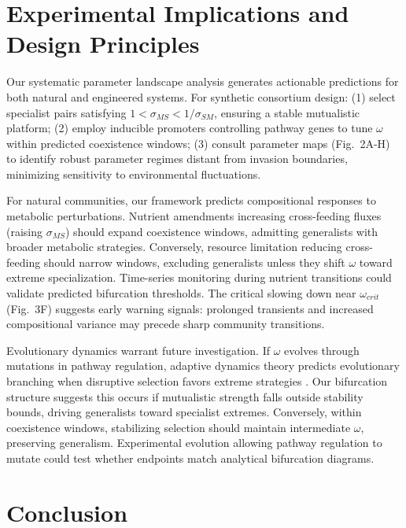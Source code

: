 \documentclass[9pt,twocolumn,twoside]{pnas-new}
\begin{document}
\section*{Experimental Implications and Design Principles}

Our systematic parameter landscape analysis generates actionable predictions for both natural and engineered systems. For synthetic consortium design: (1) select specialist pairs satisfying $1 < \sigma_{MS} < 1/\sigma_{SM}$, ensuring a stable mutualistic platform; (2) employ inducible promoters controlling pathway genes to tune $\omega$ within predicted coexistence windows; (3) consult parameter maps (Fig.~2A-H) to identify robust parameter regimes distant from invasion boundaries, minimizing sensitivity to environmental fluctuations.

For natural communities, our framework predicts compositional responses to metabolic perturbations. Nutrient amendments increasing cross-feeding fluxes (raising $\sigma_{MS}$) should expand coexistence windows, admitting generalists with broader metabolic strategies. Conversely, resource limitation reducing cross-feeding should narrow windows, excluding generalists unless they shift $\omega$ toward extreme specialization. Time-series monitoring during nutrient transitions could validate predicted bifurcation thresholds. The critical slowing down near $\omega_{crit}$ (Fig.~3F) suggests early warning signals: prolonged transients and increased compositional variance may precede sharp community transitions.

Evolutionary dynamics warrant future investigation. If $\omega$ evolves through mutations in pathway regulation, adaptive dynamics theory predicts evolutionary branching when disruptive selection favors extreme strategies \cite{geritz1998evolutionarily}. Our bifurcation structure suggests this occurs if mutualistic strength falls outside stability bounds, driving generalists toward specialist extremes. Conversely, within coexistence windows, stabilizing selection should maintain intermediate $\omega$, preserving generalism. Experimental evolution allowing pathway regulation to mutate could test whether endpoints match analytical bifurcation diagrams.

\section*{Conclusion}
\end{document}
